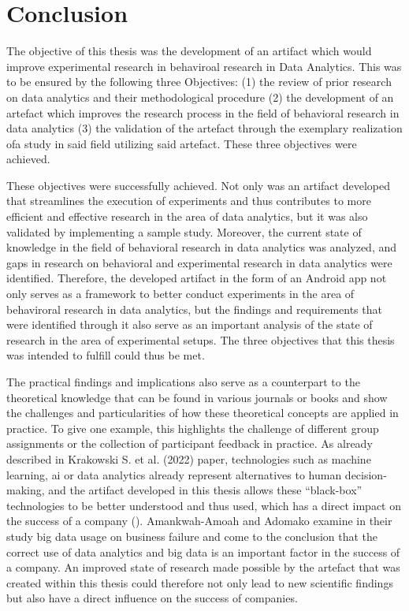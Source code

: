 \section{Conclusion}

The objective of this thesis was the development of an artifact which would improve experimental research in behaviroal research in Data Analytics. This was to be ensured by the following three Objectives: (1) the review of prior research on data analytics and their methodological procedure (2) the development of an artefact which improves the research process in the field of behavioral research in data analytics (3) the validation of the artefact through the exemplary realization ofa study in said field utilizing said artefact. These three objectives were achieved.

These objectives were successfully achieved. Not only was an artifact developed that streamlines the execution of experiments and thus contributes to more efficient and effective research in the area of data analytics, but 
it was also validated by implementing a sample study. Moreover, the current state of knowledge in the field of behavioral research in data analytics was analyzed, and gaps in research on behavioral and experimental research in data analytics were identified. Therefore, the developed artifact in the form of an Android app not only serves as a framework to better conduct experiments in the area of behaviroral research in data analytics, but the findings and requirements that were identified through it also serve as an important analysis of the state of research in the area of experimental setups. The three objectives that this thesis was intended to fulfill could thus be met.

The practical findings and implications also serve as a counterpart to the theoretical knowledge that can be found in various journals or books and show the challenges and particularities of how these theoretical concepts are applied in practice. To give one example, this highlights the challenge of different group assignments or the collection of participant feedback in practice. As already described in Krakowski S. et al. (2022) paper, technologies such as machine learning, \ac{ai} or data analytics already represent alternatives to human decision-making, and the artifact developed in this thesis allows these \enquote{black-box} technologies to be better understood and thus used, which has a direct impact on the success of a company (\cite{Krakowski.2023}). Amankwah-Amoah and Adomako examine in their study big data usage on business failure and come to the conclusion that the correct use of data analytics and big data is an important factor in the success of a company. An improved state of research made possible by the artefact that was created within this thesis could therefore not only lead to new scientific findings but also have a direct influence on the success of companies.

